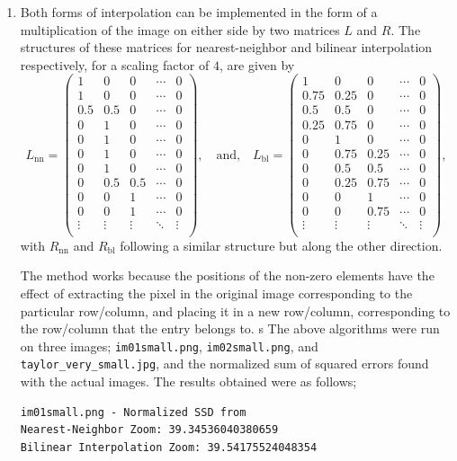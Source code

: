 \documentclass{article}[a4paper]
\begin{document}
\begin{enumerate}
	\item Both forms of interpolation can be implemented in the form of a multiplication of the image on either side by two matrices $L$ and $R$.
	The structures of these matrices for nearest-neighbor and bilinear interpolation respectively, for a scaling factor of $4$, are given by \[
		L_\text{nn} = \begin{pmatrix}
			1	& 0 	& 0 & \cdots & 0 \\
			1	& 0 	& 0 & \cdots & 0 \\
			0.5	& 0.5 	& 0 & \cdots & 0 \\
			0	& 1		& 0 & \cdots & 0 \\
			0	& 1		& 0 & \cdots & 0 \\
			0	& 1		& 0 & \cdots & 0 \\
			0	& 1		& 0 & \cdots & 0 \\
			0	& 0.5	& 0.5 & \cdots & 0 \\
			0	& 0		& 1 & \cdots & 0 \\
			0	& 0		& 1 & \cdots & 0 \\
			\vdots & \vdots & \vdots & \ddots & \vdots \\
		\end{pmatrix},
		\quad\text{and,}\quad
		L_\text{bl} = \begin{pmatrix}
			1	& 0 	& 0 & \cdots & 0 \\
			0.75& 0.25 	& 0 & \cdots & 0 \\
			0.5	& 0.5 	& 0 & \cdots & 0 \\
			0.25& 0.75	& 0 & \cdots & 0 \\
			0	& 1		& 0 & \cdots & 0 \\
			0	& 0.75	& 0.25 & \cdots & 0 \\
			0	& 0.5	& 0.5 & \cdots & 0 \\
			0	& 0.25	& 0.75 & \cdots & 0 \\
			0	& 0		& 1 & \cdots & 0 \\
			0	& 0		& 0.75 & \cdots & 0 \\
			\vdots & \vdots & \vdots & \ddots & \vdots \\
		\end{pmatrix},
	\] with $R_\text{nn}$ and $R_\text{bl}$ following a similar structure but along the other direction.
	
	The method works because the positions of the non-zero elements have the effect of extracting the pixel in the original image corresponding to the particular
	row/column, and placing it in a new row/column, corresponding to the row/column that the entry belongs to.
s
	The above algorithms were run on three images; \texttt{im01small.png}, \texttt{im02small.png}, and \texttt{taylor\_very\_small.jpg}, and the
	normalized sum of squared errors found with the actual images. The results obtained were as follows;
	\begin{verbatim}im01small.png - Normalized SSD from
Nearest-Neighbor Zoom: 39.34536040380659
Bilinear Interpolation Zoom: 39.54175524048354


\end{verbatim}
\end{enumerate}
\end{document}
